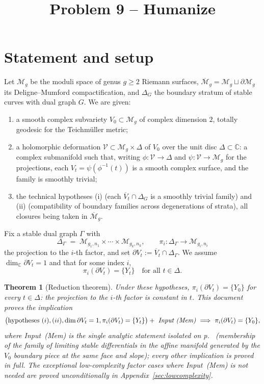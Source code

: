 \documentclass[11pt]{article}
\newcommand{\C}{\mathbb{C}}
\newcommand{\M}{\mathcal{M}}
\newtheorem{thm}{Theorem}[section]
\theoremstyle{definition}
\theoremstyle{remark}
\begin{document}
\title{Problem 9 -- Humanize}
\author{}
\date{}
\maketitle


\section{Statement and setup}

Let $\M_g$ be the moduli space of genus $g \ge 2$ Riemann surfaces,
$\overline{\M}_g = \M_g \sqcup \partial \M_g$ its Deligne--Mumford
compactification, and $\Delta_G$ the boundary stratum of stable curves with
dual graph $G$. We are given:
\begin{enumerate}[label=(\Roman*)]
\item a smooth complex subvariety $V_0 \subset \M_g$ of complex dimension $2$,
totally geodesic for the Teichm\"uller metric;
\item a holomorphic deformation $\mathcal{V} \subset \M_g \times \Delta$ of
$V_0$ over the unit disc $\Delta \subset \C$: a complex submanifold such
that, writing $\phi : \mathcal{V} \to \Delta$ and $\psi : \mathcal{V} \to
\M_g$ for the projections, each $V_t = \psi(\phi^{-1}(t))$ is a smooth
complex surface, and the family is smoothly trivial;
\item the technical hypotheses (i) (each $\overline{V}_t \cap \Delta_G$ is a
smoothly trivial family) and (ii) (compatibility of boundary families across
degenerations of strata), all closures being taken in $\overline{\M}_g$.
\end{enumerate}
Fix a stable dual graph $\Gamma$ with
\[
\Delta_\Gamma \;=\; \M_{g_1,n_1} \times \cdots \times \M_{g_k,n_k},
\qquad \pi_i : \Delta_\Gamma \longrightarrow \M_{g_i,n_i}
\]
the projection to the $i$-th factor, and set
$\partial V_t := \overline{V}_t \cap \Delta_\Gamma$. We assume
$\dim_{\C} \partial V_t = 1$ and that for some index $i$,
\[
\pi_i(\partial V_t) = \{Y_t\} \quad \text{for all } t \in \Delta .
\]

\begin{thm}[Reduction theorem]\label{thm:main}
Under these hypotheses, $\pi_i(\partial V_t) = \{Y_0\}$ for every
$t \in \Delta$: the projection to the $i$-th factor is constant in
$t$. \emph{This document proves the implication}
\[
\bigl(\text{hypotheses } (i), (ii), \dim\partial V_t = 1,
\pi_i(\partial V_t) = \{Y_t\}\bigr)
+\ \emph{Input~(Mem)}
\ \Longrightarrow\ \pi_i(\partial V_t) = \{Y_0\} ,
\]
where \emph{Input~(Mem)} is the single analytic statement isolated on
p.\ \pageref{input:membership} (membership of the family of limiting
stable differentials in the affine manifold generated by the $V_0$
boundary piece at the same face and slope); every other implication is
proved in full. The exceptional low-complexity factor cases where
Input~(Mem) is not needed are proved unconditionally in
Appendix~\ref{sec:lowcomplexity}.
\end{thm}
\end{document}
